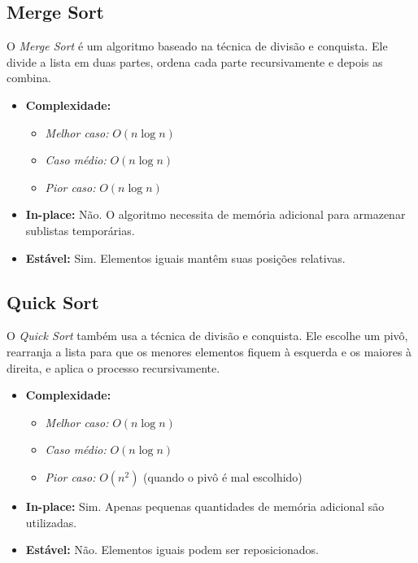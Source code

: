 \documentclass[12pt,a4paper]{article}
\begin{document}
\subsection{Merge Sort}
O \textit{Merge Sort} é um algoritmo baseado na técnica de divisão e conquista. Ele divide a lista em duas partes, ordena cada parte recursivamente e depois as combina.

\begin{itemize}
    \item \textbf{Complexidade:}
    \begin{itemize}
        \item \textit{Melhor caso:} $O(n \log n)$
        \item \textit{Caso médio:} $O(n \log n)$
        \item \textit{Pior caso:} $O(n \log n)$
    \end{itemize}
    \item \textbf{In-place:} Não. O algoritmo necessita de memória adicional para armazenar sublistas temporárias.
    \item \textbf{Estável:} Sim. Elementos iguais mantêm suas posições relativas.
\end{itemize}


\subsection{Quick Sort}
O \textit{Quick Sort} também usa a técnica de divisão e conquista. Ele escolhe um pivô, rearranja a lista para que os menores elementos fiquem à esquerda e os maiores à direita, e aplica o processo recursivamente.

\begin{itemize}
    \item \textbf{Complexidade:}
    \begin{itemize}
        \item \textit{Melhor caso:} $O(n \log n)$
        \item \textit{Caso médio:} $O(n \log n)$
        \item \textit{Pior caso:} $O(n^2)$ (quando o pivô é mal escolhido)
    \end{itemize}
    \item \textbf{In-place:} Sim. Apenas pequenas quantidades de memória adicional são utilizadas.
    \item \textbf{Estável:} Não. Elementos iguais podem ser reposicionados.
\end{itemize}
\end{document}
